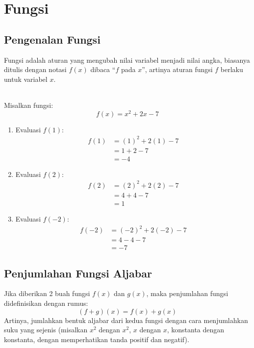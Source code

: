 \section{Fungsi}
\subsection{Pengenalan Fungsi}
\begin{definition}[Fungsi]
  Fungsi adalah aturan yang mengubah nilai variabel menjadi nilai angka, biasanya ditulis dengan notasi $f(x)$ dibaca ``$f$ pada $x$'', artinya aturan fungsi $f$ berlaku untuk variabel $x$.
\end{definition}

\begin{example}[Fungsi]
  \hfill \\
  Misalkan fungsi:
  \[ f(x) = x^2 + 2x - 7 \]
  \begin{enumerate}
  \item Evaluasi $f(1)$:
    \[
    \begin{aligned}
      f(1) &= (1)^2 + 2(1) - 7 \\
      &= 1 + 2 - 7 \\
      &= -4
    \end{aligned}
    \]
  \item Evaluasi $f(2)$:
    \[
    \begin{aligned}
      f(2) &= (2)^2 + 2(2) - 7 \\
      &= 4 + 4 - 7 \\
      &= 1
    \end{aligned}
    \]
  \item Evaluasi $f(-2)$:
    \[
    \begin{aligned}
      f(-2) &= (-2)^2 + 2(-2) - 7 \\
      &= 4 - 4 - 7 \\
      &= -7
    \end{aligned}
    \]
  \end{enumerate}
\end{example}

\subsection{Penjumlahan Fungsi Aljabar}
\begin{definition}
  Jika diberikan 2 buah fungsi $f(x)$ dan $g(x)$, maka penjumlahan fungsi didefinisikan dengan rumus:
  \[ (f + g)(x) = f(x) + g(x) \]
  Artinya, jumlahkan bentuk aljabar dari kedua fungsi dengan cara menjumlahkan suku yang sejenis (misalkan $x^2$ dengan $x^2$, $x$ dengan $x$, konstanta dengan konstanta, dengan memperhatikan tanda positif dan negatif).
\end{definition}

